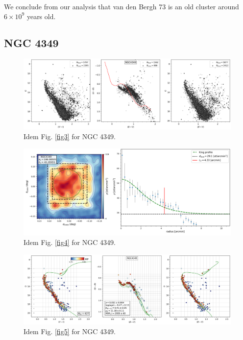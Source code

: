 \documentclass[draft]{aa}
\begin{document}
We conclude from our analysis that van den Bergh 73 is an old cluster around
$6\times10^9$ years old.



\subsection{NGC 4349}

\begin{figure}[ht]
    \centering
    \includegraphics[width=\hsize]{../figs/obs_NGC4349.png}
    \caption{Idem Fig. \ref{fig3} for NGC 4349.}
    \label{fig63}
\end{figure}
\begin{figure}[ht]
    \centering
    \includegraphics[width=\hsize]{../figs/dmap_ngc4349.png}
    \caption{Idem Fig. \ref{fig4} for NGC 4349.}
    \label{fig64}
\end{figure}
\begin{figure}[ht]
    \centering
    \includegraphics[width=\hsize]{../figs/cmds_ngc4349.png}
    \caption{Idem Fig. \ref{fig5} for NGC 4349.}
    \label{fig65}
\end{figure}
\end{document}
